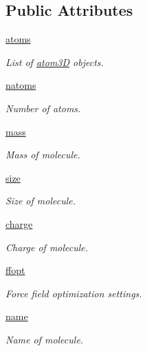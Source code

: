 \subsection*{Public Attributes}
\begin{DoxyCompactItemize}
\item 
\hyperlink{classmolSimplify_1_1Classes_1_1mol3D_1_1mol3D_af02359e712403cf94bda038aeadbaa58}{atoms}
\begin{DoxyCompactList}\small\item\em List of \hyperlink{namespacemolSimplify_1_1Classes_1_1atom3D}{atom3D} objects. \end{DoxyCompactList}\item 
\hyperlink{classmolSimplify_1_1Classes_1_1mol3D_1_1mol3D_af232ea2794ec4a1968befbad30d48913}{natoms}
\begin{DoxyCompactList}\small\item\em Number of atoms. \end{DoxyCompactList}\item 
\hyperlink{classmolSimplify_1_1Classes_1_1mol3D_1_1mol3D_abd8025bde323e199207f372539fc0ceb}{mass}
\begin{DoxyCompactList}\small\item\em Mass of molecule. \end{DoxyCompactList}\item 
\hyperlink{classmolSimplify_1_1Classes_1_1mol3D_1_1mol3D_a8ea7381eb4e01c2b290446c7299dad9a}{size}
\begin{DoxyCompactList}\small\item\em Size of molecule. \end{DoxyCompactList}\item 
\hyperlink{classmolSimplify_1_1Classes_1_1mol3D_1_1mol3D_aa81f118b37cdb2b11681f1361b51fed7}{charge}
\begin{DoxyCompactList}\small\item\em Charge of molecule. \end{DoxyCompactList}\item 
\hyperlink{classmolSimplify_1_1Classes_1_1mol3D_1_1mol3D_ac8526f460332be176e5009f6e2ae8745}{ffopt}
\begin{DoxyCompactList}\small\item\em Force field optimization settings. \end{DoxyCompactList}\item 
\hyperlink{classmolSimplify_1_1Classes_1_1mol3D_1_1mol3D_a06cc059cb532fb64b3e9faa84ae1f8c9}{name}
\begin{DoxyCompactList}\small\item\em Name of molecule. \end{DoxyCompactList}\item 

\end{DoxyCompactItemize}
